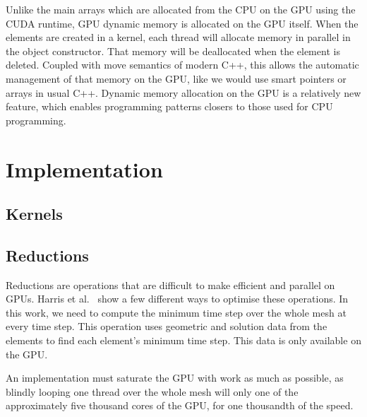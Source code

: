 Unlike the main arrays which are allocated from the CPU on the GPU using the CUDA runtime, GPU
dynamic memory is allocated on the GPU itself. When the elements are created in a kernel, each
thread will allocate memory in parallel in the object constructor. That memory will be deallocated
when the element is deleted. Coupled with move semantics of modern C++, this allows the automatic
management of that memory on the GPU, like we would use smart pointers or arrays in usual C++.
Dynamic memory allocation on the GPU is a relatively new feature, which enables programming patterns
closers to those used for CPU programming.

\section{Implementation} \label{section:graphics_processing_units:implementation}

\subsection{Kernels} \label{section:graphics_processing_units:implementation:kernels}

\subsection{Reductions} \label{section:graphics_processing_units:implementation:reductions}

Reductions are operations that are difficult to make efficient and parallel on GPUs. Harris et
al.~\cite{Harris2007} show a few different ways to optimise these operations. In this work, we need
to compute the minimum time step over the whole mesh at every time step. This operation uses
geometric and solution data from the elements to find each element's minimum time step. This data is
only available on the GPU. 

An implementation must saturate the GPU with work as much as possible, as blindly looping one thread
over the whole mesh will only one of the approximately five thousand cores of the GPU, for one
thousandth of the speed. 